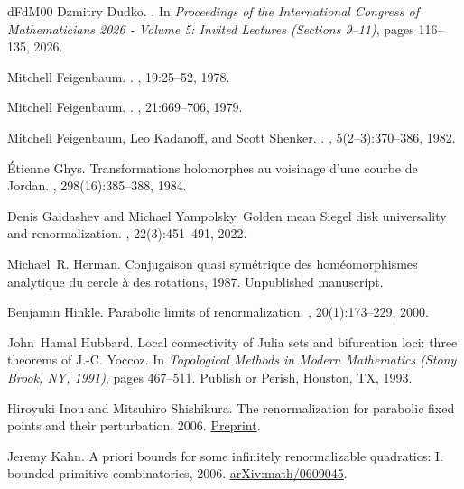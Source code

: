 \documentclass{amsart}
\begin{document}
\begin{thebibliography}{dFdM00}
Dzmitry Dudko.
.
\newblock In {\em Proceedings of the International Congress of Mathematicians 2026 - Volume 5: Invited Lectures (Sections 9--11)}, pages 116--135, 2026.

Mitchell Feigenbaum.
.
, 19:25--52, 1978.

Mitchell Feigenbaum.
.
, 21:669--706, 1979.

Mitchell Feigenbaum, Leo Kadanoff, and Scott Shenker.
.
, 5(2--3):370--386, 1982.

{\'E}tienne Ghys.
\newblock Transformations holomorphes au voisinage d'une courbe de {Jordan}.
, 298(16):385--388, 1984.

Denis Gaidashev and Michael Yampolsky.
\newblock Golden mean {Siegel} disk universality and renormalization.
, 22(3):451--491, 2022.

Michael~R. Herman.
\newblock Conjugaison quasi sym\'etrique des hom\'eomorphismes analytique du cercle \`a des rotations, 1987.
\newblock Unpublished manuscript.

Benjamin Hinkle.
\newblock Parabolic limits of renormalization.
, 20(1):173--229, 2000.

John~Hamal Hubbard.
\newblock Local connectivity of {J}ulia sets and bifurcation loci: three theorems of {J}.-{C}. {Y}occoz.
\newblock In {\em Topological Methods in Modern Mathematics ({S}tony {B}rook, {NY}, 1991)}, pages 467--511. Publish or Perish, Houston, TX, 1993.

Hiroyuki Inou and Mitsuhiro Shishikura.
\newblock The renormalization for parabolic fixed points and their perturbation, 2006.
\newblock \href{https://www.math.kyoto-u.ac.jp/~mitsu/pararenorm/ParabolicRenormalization.pdf}{Preprint}.

Jeremy Kahn.
\newblock A priori bounds for some infinitely renormalizable quadratics: I. bounded primitive combinatorics, 2006.
\newblock \href{https://arxiv.org/abs/math/0609045}{arXiv:math/0609045}.


\end{thebibliography}
\end{document}
